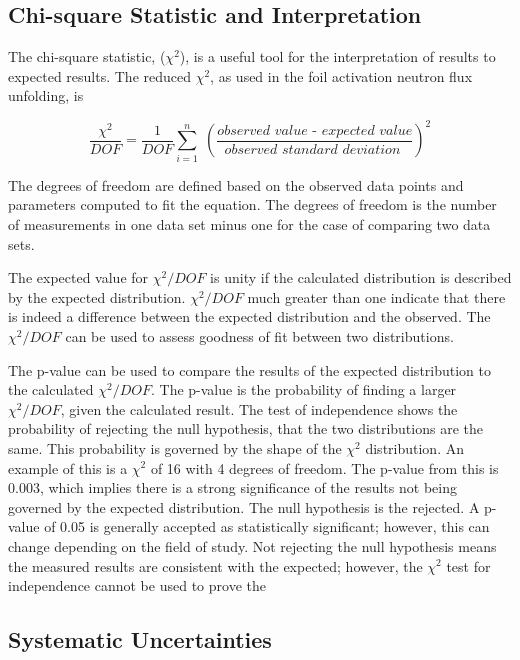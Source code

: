 {{\subsection{Chi-square Statistic and Interpretation}

The chi-square statistic, ($\chi^{2}$), is a useful tool for the interpretation of results to expected results. 
The reduced $\chi^{2}$, as used in the foil activation neutron flux unfolding, is \cite{Taylor}

\begin{equation} \label{eq:chi}
\dfrac{\chi^2}{DOF}= \dfrac{1}{DOF}\sum_{i=1}^{n} \; (\dfrac{\textit{observed value - expected value}}{\textit{observed standard deviation }})^2
\end{equation}

The degrees of freedom are defined based on the observed data points and parameters computed to fit the equation. 
The degrees of freedom is the number of measurements in one data set minus one for the case of comparing two data sets. 

The expected value for $\chi^{2}/DOF$ is unity if the calculated distribution is described by the expected distribution. 
$\chi^{2}/DOF$ much greater than one indicate that there is indeed a difference between the expected distribution and the observed. 
The  $\chi^{2}/DOF$ can be used to assess goodness of fit between two distributions. 

The p-value can be used to compare the results of the expected distribution to the calculated $\chi^{2}/DOF$. 
The p-value is the probability of finding a larger $\chi^{2}/DOF$, given the calculated result. 
The test of independence shows the probability of rejecting the null hypothesis, that the two distributions are the same. 
This probability is governed by the shape of the $\chi^{2}$ distribution.
An example of this is a $\chi^{2}$ of 16 with 4 degrees of freedom. 
The p-value from this is 0.003, which implies there is a strong significance of the results not being governed by the expected distribution. 
The null hypothesis is the rejected. 
A p-value of 0.05 is generally accepted as statistically significant; however, this can change depending on the field of study. 
Not rejecting the null hypothesis means the measured results are consistent with the expected; however, the $\chi^{2}$ test for independence cannot be used to prove the


\subsection{Systematic Uncertainties} \label{section1}

}}
